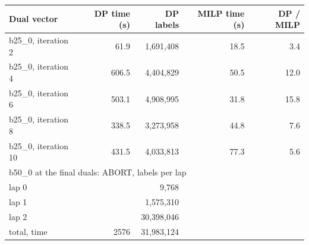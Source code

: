 \begin{tabular}{lrrrr}
\toprule
Dual vector & DP time (s) & DP labels & MILP time (s) & DP / MILP \\
\midrule
b25\_0, iteration 2 & 61.9 & 1{,}691{,}408 & 18.5 & 3.4 \\
b25\_0, iteration 4 & 606.5 & 4{,}404{,}829 & 50.5 & 12.0 \\
b25\_0, iteration 6 & 503.1 & 4{,}908{,}995 & 31.8 & 15.8 \\
b25\_0, iteration 8 & 338.5 & 3{,}273{,}958 & 44.8 & 7.6 \\
b25\_0, iteration 10 & 431.5 & 4{,}033{,}813 & 77.3 & 5.6 \\
\midrule
\multicolumn{5}{l}{b50\_0 at the final duals: ABORT, labels per lap} \\
\quad lap 0 & & 9{,}768 & & \\
\quad lap 1 & & 1{,}575{,}310 & & \\
\quad lap 2 & & 30{,}398{,}046 & & \\
\quad total, time & 2576 & 31{,}983{,}124 & & \\
\bottomrule
\end{tabular}
